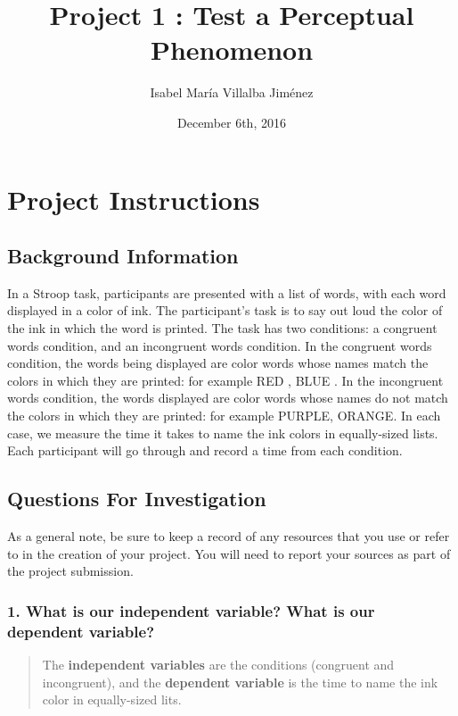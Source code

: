 \documentclass[]{article}
\title{Project 1 : Test a Perceptual Phenomenon}
\author{Isabel María Villalba Jiménez}
\date{December 6th, 2016}
\begin{document}
\maketitle

\section{Project Instructions}\label{project-instructions}

\subsection{Background Information}\label{background-information}

In a Stroop task, participants are presented with a list of words, with
each word displayed in a color of ink. The participant's task is to say
out loud the color of the ink in which the word is printed. The task has
two conditions: a congruent words condition, and an incongruent words
condition. In the congruent words condition, the words being displayed
are color words whose names match the colors in which they are printed:
for example {RED }, {BLUE }. In the incongruent words condition, the
words displayed are color words whose names do not match the colors in
which they are printed: for example {PURPLE}, { ORANGE}. In each case,
we measure the time it takes to name the ink colors in equally-sized
lists. Each participant will go through and record a time from each
condition.

\subsection{Questions For
Investigation}\label{questions-for-investigation}

As a general note, be sure to keep a record of any resources that you
use or refer to in the creation of your project. You will need to report
your sources as part of the project submission.

\subsubsection{1. What is our independent variable? What is our
dependent
variable?}\label{what-is-our-independent-variable-what-is-our-dependent-variable}

\begin{quote}
The \textbf{independent variables} are the conditions (congruent and
incongruent), and the \textbf{dependent variable} is the time to name
the ink color in equally-sized lits.
\end{quote}
\end{document}
